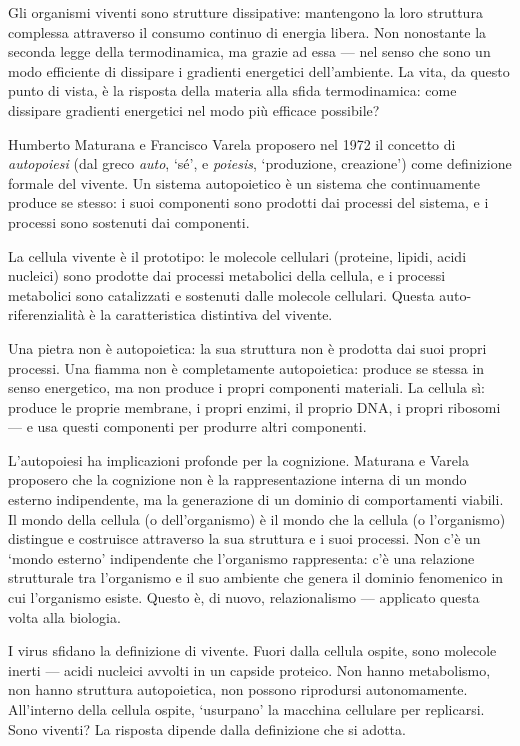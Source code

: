 \documentclass[12pt,a4paper,openany]{book}
\newcommand{\sezione}[1]{\vspace{1.2em}{\large\bfseries #1}\vspace{0.5em}\par}
\begin{document}
Gli organismi viventi sono strutture dissipative: mantengono la loro struttura complessa attraverso il consumo continuo di energia libera. Non nonostante la seconda legge della termodinamica, ma grazie ad essa --- nel senso che sono un modo efficiente di dissipare i gradienti energetici dell'ambiente. La vita, da questo punto di vista, è la risposta della materia alla sfida termodinamica: come dissipare gradienti energetici nel modo più efficace possibile?

\sezione{Autopoiesi: la vita come auto-produzione}

Humberto Maturana e Francisco Varela proposero nel 1972 il concetto di \textit{autopoiesi} (dal greco \textit{auto}, `sé', e \textit{poiesis}, `produzione, creazione') come definizione formale del vivente. Un sistema autopoietico è un sistema che continuamente produce se stesso: i suoi componenti sono prodotti dai processi del sistema, e i processi sono sostenuti dai componenti.

La cellula vivente è il prototipo: le molecole cellulari (proteine, lipidi, acidi nucleici) sono prodotte dai processi metabolici della cellula, e i processi metabolici sono catalizzati e sostenuti dalle molecole cellulari. Questa auto-riferenzialità è la caratteristica distintiva del vivente.

Una pietra non è autopoietica: la sua struttura non è prodotta dai suoi propri processi. Una fiamma non è completamente autopoietica: produce se stessa in senso energetico, ma non produce i propri componenti materiali. La cellula sì: produce le proprie membrane, i propri enzimi, il proprio DNA, i propri ribosomi --- e usa questi componenti per produrre altri componenti.

L'autopoiesi ha implicazioni profonde per la cognizione. Maturana e Varela proposero che la cognizione non è la rappresentazione interna di un mondo esterno indipendente, ma la generazione di un dominio di comportamenti viabili. Il mondo della cellula (o dell'organismo) è il mondo che la cellula (o l'organismo) distingue e costruisce attraverso la sua struttura e i suoi processi. Non c'è un `mondo esterno' indipendente che l'organismo rappresenta: c'è una relazione strutturale tra l'organismo e il suo ambiente che genera il dominio fenomenico in cui l'organismo esiste. Questo è, di nuovo, relazionalismo --- applicato questa volta alla biologia.

\sezione{Il confine della vita: virus e prioni}

I virus sfidano la definizione di vivente. Fuori dalla cellula ospite, sono molecole inerti --- acidi nucleici avvolti in un capside proteico. Non hanno metabolismo, non hanno struttura autopoietica, non possono riprodursi autonomamente. All'interno della cellula ospite, `usurpano' la macchina cellulare per replicarsi. Sono viventi? La risposta dipende dalla definizione che si adotta.
\end{document}
